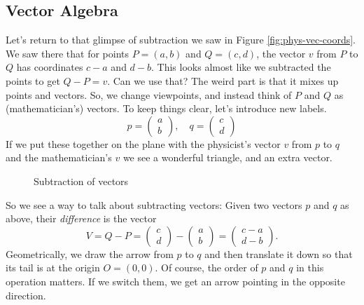 \documentclass[elementsmain.tex]{subfiles}
\begin{document}
\subsection*{Vector Algebra}

Let's return to that glimpse of subtraction we saw in Figure \ref{fig:phys-vec-coords}.
We saw there that for points $P = (a,b)$ and $Q = (c,d)$, the vector $v$ from $P$ to $Q$ has coordinates $c-a$ and $d-b$.
This looks almost like we subtracted the points to get $Q-P = v$.
Can we use that?
The weird part is that it mixes up points and vectors.
So, we change viewpoints, and instead think of $P$ and $Q$ as (mathematician's) vectors. To keep things clear, let's introduce new labels.
\[
p = \begin{pmatrix} a \\ b \end{pmatrix}, \quad q = \begin{pmatrix} c \\ d \end{pmatrix}
\]
If we put these together on the plane with the physicist's vector $v$ from $p$ to $q$ and the mathematician's $v$ we see a wonderful triangle, and an extra vector.
\begin{figure}[h]
\centering
{}
\caption{Subtraction of vectors}
\label{fig:subtract-vec}
\end{figure}
So we see a way to talk about subtracting vectors: Given two vectors $p$ and $q$ as above, their
\emph{difference} is the vector
\[
V = Q-P = \begin{pmatrix} c \\ d \end{pmatrix} - \begin{pmatrix} a \\ b \end{pmatrix} = \begin{pmatrix} c-a \\ d-b \end{pmatrix}.
\]
Geometrically, we draw the arrow from $p$ to $q$ and then translate it down so that its tail is at the origin $O=(0,0)$. Of course, the order of $p$ and $q$ in this operation matters. If we switch them, we get an arrow pointing in the opposite direction.
\end{document}
